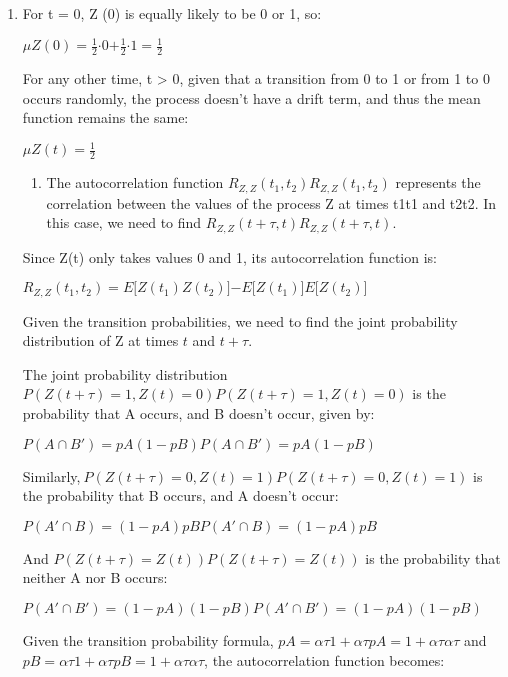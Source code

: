 \documentclass{article}
\begin{document}
\begin{enumerate}
\newpage
\item
    For t = 0, Z (0) is equally likely to be 0 or 1, so:

    ${\mu Z}(0) = \frac{1}{2}\mathbf{\cdot}0\mathbf{+}\frac{1}{2}\mathbf{\cdot}1 = \frac{1}{2}$

    For any other time, t \textgreater{} 0, given that a transition from 0
    to 1 or from 1 to 0 occurs randomly, the process doesn't have a drift
    term, and thus the mean function remains the same:

    ${\mu Z(t)} = \frac{1}{2}$

    \begin{enumerate}
    \item
        The autocorrelation function
        \(R_{Z,Z}\left( t_{1},t_{2} \right)R_{Z,Z}(t_{1},t_{2})\) represents
        the correlation between the values of the process Z at times
        t1t1\hspace{0pt} and t2t2\hspace{0pt}. In this case, we need to find
        \(R_{Z,Z}(t + \tau,t)R_{Z,Z}(t + \tau,t)\).
    \end{enumerate}

    Since Z(t) only takes values 0 and 1, its autocorrelation function is:

    $R_{Z,Z}(t_{1},t_{2}) = E\lbrack Z(t_{1})Z(t_{2})\rbrack\mathbf{-}E\lbrack Z(t_{1})\rbrack E\lbrack Z(t_{2})\rbrack$

    Given the transition probabilities, we need to find the joint
    probability distribution of Z at times \(t\) and \(t + \tau\).

    The joint probability distribution
    \(P(Z(t + \tau) = 1,Z(t) = 0)P(Z(t + \tau) = 1,Z(t) = 0)\) is the
    probability that A occurs, and B doesn't occur, given by:

    $P(A \cap B') = pA(1 - pB)P(A \cap B') = pA(1 - pB)$

    Similarly,\(\ P(Z(t + \tau) = 0,Z(t) = 1)P(Z(t + \tau) = 0,Z(t) = 1)\)
    is the probability that B occurs, and A doesn't occur:

    $P(A' \cap B) = (1 - pA)pBP(A' \cap B) = (1 - pA)pB$

    And \(P(Z(t + \tau) = Z(t))P(Z(t + \tau) = Z(t))\) is the probability
    that neither A nor B occurs:

    $P(A' \cap B') = (1 - pA)(1 - pB)P(A' \cap B') = (1 - pA)(1 - pB)$

    Given the transition probability formula,
    \(pA = \alpha\tau 1 + \alpha\tau pA = 1 + \alpha\tau\alpha\tau\)\hspace{0pt}
    and
    \(pB = \alpha\tau 1 + \alpha\tau pB = 1 + \alpha\tau\alpha\tau\)\hspace{0pt},
    the autocorrelation function becomes:


\end{enumerate}
\end{document}
